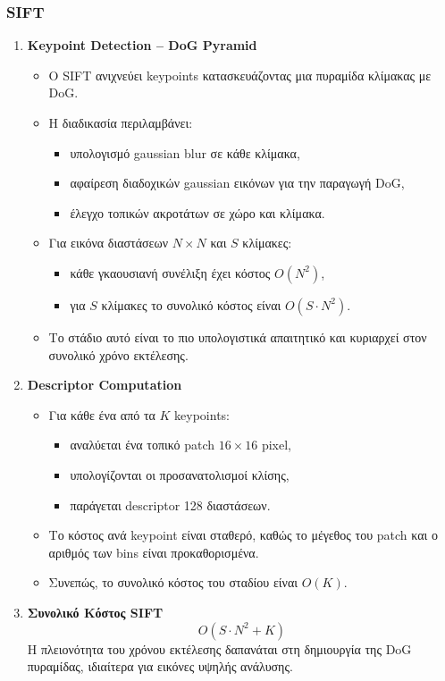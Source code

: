 \documentclass[12pt]{article}
\begin{document}
\subsubsection{SIFT}
\begin{enumerate}
  \item \textbf{Keypoint Detection -- DoG Pyramid}
  \begin{itemize}
      \item Ο SIFT ανιχνεύει keypoints κατασκευάζοντας μια πυραμίδα κλίμακας με DoG.
      \item Η διαδικασία περιλαμβάνει:
      \begin{itemize}
          \item υπολογισμό gaussian blur σε κάθε κλίμακα,
          \item αφαίρεση διαδοχικών gaussian εικόνων για την παραγωγή DoG,
          \item έλεγχο τοπικών ακροτάτων σε χώρο και κλίμακα.
      \end{itemize}
      \item Για εικόνα διαστάσεων $N \times N$ και $S$ κλίμακες:
      \begin{itemize}
          \item κάθε γκαουσιανή συνέλιξη έχει κόστος $O(N^2)$,
          \item για $S$ κλίμακες το συνολικό κόστος είναι $O(S \cdot N^2)$.
      \end{itemize}
      \item Το στάδιο αυτό είναι το πιο υπολογιστικά απαιτητικό και κυριαρχεί στον συνολικό χρόνο εκτέλεσης.
  \end{itemize}

  \item \textbf{Descriptor Computation}
  \begin{itemize}
      \item Για κάθε ένα από τα $K$ keypoints:
      \begin{itemize}
          \item αναλύεται ένα τοπικό patch $16 \times 16$ pixel,
          \item υπολογίζονται οι προσανατολισμοί κλίσης,
          \item παράγεται descriptor 128 διαστάσεων.
      \end{itemize}
      \item Το κόστος ανά keypoint είναι σταθερό, καθώς το μέγεθος του patch και ο αριθμός των bins είναι προκαθορισμένα.
      \item Συνεπώς, το συνολικό κόστος του σταδίου είναι $O(K)$.
  \end{itemize}

  \item \textbf{Συνολικό Κόστος SIFT}
  \[
      O(S \cdot N^2 + K)
  \]
  Η πλειονότητα του χρόνου εκτέλεσης δαπανάται στη δημιουργία της DoG πυραμίδας, ιδιαίτερα για εικόνες υψηλής ανάλυσης.
\end{enumerate}
\end{document}
